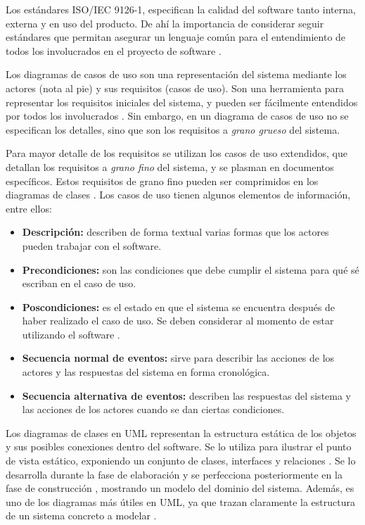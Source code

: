 Los estándares ISO/IEC 9126-1, especifican la calidad del software tanto interna, externa y en uso del producto. De ahí la importancia de considerar seguir estándares que permitan asegurar un lenguaje común para el entendimiento de todos los involucrados en el proyecto de software \parencite{Losavio2009}.

Los diagramas de casos de uso son una representación del sistema mediante los actores (nota al pie) y sus requisitos (casos de uso). Son una herramienta para representar los requisitos iniciales del sistema, y pueden ser fácilmente entendidos por todos los involucrados \parencite{Zapata2008}. Sin embargo, en un diagrama de casos de uso no se especifican los detalles, sino que son los requisitos a \textit{grano grueso} del sistema. 

Para mayor detalle de los requisitos se utilizan los casos de uso extendidos, que detallan los requisitos a \textit{grano fino} del sistema, y se plasman en documentos específicos. Estos requisitos de grano fino pueden ser comprimidos en los diagramas de clases \parencite{Abdelnabi2021}. Los casos de uso tienen algunos elementos de información, entre ellos: 

\begin{itemize}
	\item \textbf{Descripción:} describen de forma textual varias formas que los actores pueden trabajar con el software.
	\item\textbf{ Precondiciones:} son las condiciones que debe cumplir el sistema para qué sé escriban en el caso de uso.
	\item \textbf{Poscondiciones:} es el estado en que el sistema se encuentra después de haber realizado el caso de uso. Se deben considerar al momento de estar utilizando el software \parencite{iqbal2020}.
	\item \textbf{Secuencia normal de eventos:} sirve para describir las acciones de los actores y las respuestas del sistema en forma cronológica.
	\item \textbf{Secuencia alternativa de eventos:} describen las respuestas del sistema y las acciones de los actores cuando se dan ciertas condiciones.
\end{itemize}

\par{
Los diagramas de clases en UML representan la estructura estática de los objetos y sus posibles conexiones dentro del software. Se lo utiliza para ilustrar el punto de vista estático, exponiendo un conjunto de clases, interfaces y relaciones \parencite{abu2020}. Se lo desarrolla durante la fase de elaboración y se perfecciona posteriormente en la fase de construcción \parencite{Omg2009}, mostrando un modelo del dominio del sistema. Además, es uno de los diagramas más útiles en UML, ya que trazan claramente la estructura de un sistema concreto a modelar \parencite{abu2020}.}


